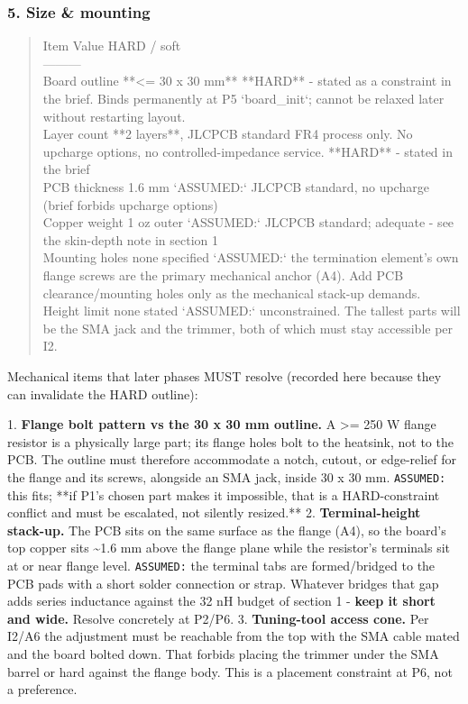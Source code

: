 \documentclass[11pt,a4paper]{article}
\begin{document}
\subsubsection*{5. Size \& mounting}
\begin{quote}\small\ttfamily\raggedright
\textbar{} Item \textbar{} Value \textbar{} HARD / soft \textbar{}\\
\textbar{}---\textbar{}---\textbar{}---\textbar{}\\
\textbar{} Board outline \textbar{} {*}{*}\textless{}= 30 x 30 mm{*}{*} \textbar{} {*}{*}HARD{*}{*} - stated as a constraint in the brief. Binds permanently at P5 `board\_init`; cannot be relaxed later without restarting layout. \textbar{}\\
\textbar{} Layer count \textbar{} {*}{*}2 layers{*}{*}, JLCPCB standard FR4 process only. No upcharge options, no controlled-impedance service. \textbar{} {*}{*}HARD{*}{*} - stated in the brief \textbar{}\\
\textbar{} PCB thickness \textbar{} 1.6 mm \textbar{} `ASSUMED:` JLCPCB standard, no upcharge (brief forbids upcharge options) \textbar{}\\
\textbar{} Copper weight \textbar{} 1 oz outer \textbar{} `ASSUMED:` JLCPCB standard; adequate - see the skin-depth note in section 1 \textbar{}\\
\textbar{} Mounting holes \textbar{} none specified \textbar{} `ASSUMED:` the termination element's own flange screws are the primary mechanical anchor (A4). Add PCB clearance/mounting holes only as the mechanical stack-up demands. \textbar{}\\
\textbar{} Height limit \textbar{} none stated \textbar{} `ASSUMED:` unconstrained. The tallest parts will be the SMA jack and the trimmer, both of which must stay accessible per I2. \textbar{}
\end{quote}
Mechanical items that later phases MUST resolve (recorded here because they can invalidate the HARD outline):

1. \textbf{Flange bolt pattern vs the 30 x 30 mm outline.} A \textgreater{}= 250 W flange resistor is a physically large part; its flange holes bolt to the heatsink, not to the PCB. The outline must therefore accommodate a notch, cutout, or edge-relief for the flange and its screws, alongside an SMA jack, inside 30 x 30 mm. \texttt{ASSUMED:} this fits; {*}{*}if P1's chosen part makes it impossible, that is a HARD-constraint conflict and must be escalated, not silently resized.{*}{*} 2. \textbf{Terminal-height stack-up.} The PCB sits on the same surface as the flange (A4), so the board's top copper sits \textasciitilde{}1.6 mm above the flange plane while the resistor's terminals sit at or near flange level. \texttt{ASSUMED:} the terminal tabs are formed/bridged to the PCB pads with a short solder connection or strap. Whatever bridges that gap adds series inductance against the 32 nH budget of section 1 - \textbf{keep it short and wide.} Resolve concretely at P2/P6. 3. \textbf{Tuning-tool access cone.} Per I2/A6 the adjustment must be reachable from the top with the SMA cable mated and the board bolted down. That forbids placing the trimmer under the SMA barrel or hard against the flange body. This is a placement constraint at P6, not a preference.
\end{document}
